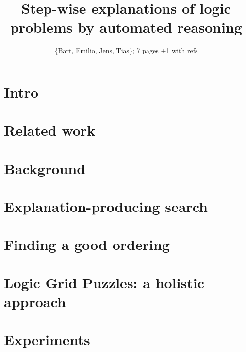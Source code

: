 \documentclass{ecai}
\begin{document}
\title{Step-wise explanations of logic problems by automated reasoning}

\author{\{Bart, Emilio, Jens, Tias\}; 7 pages +1 with refs}

\maketitle


\begin{abstract}

\end{abstract}


\section{Intro}



\section{Related work}


\section{Background}


%


\section{Explanation-producing search}



\section{Finding a good ordering}



\section{Logic Grid Puzzles: a holistic approach}\label{sec:holistic}



\section{Experiments}




\end{document}
